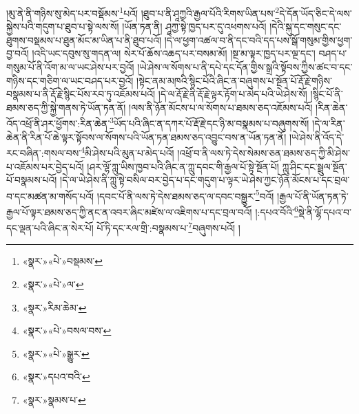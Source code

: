 །མུ་ནེ་ནི་གཉིས་སུ་མེད་པར་བསྡོམས་\footnote{«སྣར་»«པེ་»བསྡམས་}པའོ། །ཐུབ་པ་ནི་ཤཱཀྱའི་རྒྱལ་པོའི་རིགས་ཡིན་པས་\footnote{«སྣར་»«པེ་»ལ་}དེ་དོན་ཡོད་ཅིང་དེ་ལས་སྐྱེས་པའི་གདུག་པ་ཐུབ་པ་སྟེ་ལས་སོ། །ཡོན་ཏན་ནི། ཤཱཀྱ་སྟེ་ཁྱད་པར་དུ་འཕགས་པའོ། །དེའི་སྐུ་དང་གསུང་དང་ཐུགས་བསྡམས་པ་ཐུན་མོང་མ་ཡིན་པ་ནི་ཐུབ་པའོ། །དེ་ལ་ཕྱག་འཚལ་བ་ནི་དང་བའི་དད་པས་སྒོ་གསུམ་གྱིས་ཕྱག་བྱ་བའོ། །འདི་ཡང་དབུས་སུ་གདན་ལ། སེར་པོ་ཆོས་འཆད་པར་བསམ་མོ། །སྔ་མ་ལྟར་ཁྱད་པར་ལྔ་དང་། བཤད་པ་གསུམ་པོ་ནི་འོག་མ་ལ་ཡང་ཤེས་པར་བྱའོ། །ཡེ་ཤེས་ལ་སོགས་པ་ནི་དཔེ་དང་དོན་གྱིས་སྒྲའི་སྟོབས་ཀྱིས་ཚང་བ་དང་གཉིས་དང་གཅིག་ལ་ཡང་བཤད་པར་བྱའོ། །སྟེང་ནམ་མཁའི་སྙིང་པོའི་ཞིང་ན་བཞུགས་པ་སྔོན་པོ་རྡོ་རྗེ་གཉིས་བསྣམས་པ་ནི་རྡོ་རྗེ་སྙིང་པོས་རབ་ཏུ་འཇོམས་པའོ། །དེ་ལ་རྡོ་རྗེ་ནི་རྡོ་རྗེ་ལྟར་རྟོག་པ་མེད་པའི་ཡེ་ཤེས་སོ། །སྙིང་པོ་ནི་ཐམས་ཅད་ཀྱི་སྐྱེ་གནས་ཏེ་ཡོན་ཏན་ནོ། །ལས་ནི་ཉོན་མོངས་པ་ལ་སོགས་པ་ཐམས་ཅད་འཇོམས་པའོ། །རིན་ཆེན་འོད་འཕྲོ་ནི་ཤར་ཕྱོགས་:རིན་ཆེན་\footnote{«སྣར་»རིམ་ཆེམ་}ཡོད་པའི་ཞིང་ན་དཀར་པོ་རྡོ་རྗེ་དང་ཉི་མ་བསྣམས་པ་བཞུགས་སོ། །དེ་ལ་རིན་ཆེན་ནི་རིན་པོ་ཆེ་ལྟར་སྟོབས་ལ་སོགས་པའི་ཡོན་ཏན་ཐམས་ཅད་འབྱུང་བས་ན་ཡོན་ཏན་ནོ། །ཡེ་ཤེས་ནི་འོད་དེ་རང་བཞིན་:གསལ་བས་\footnote{«སྣར་»«པེ་»བསལ་བས་}མི་ཤེས་པའི་མུན་པ་མེད་པའོ། །འཕྲོ་བ་ནི་ལས་ཏེ་དེས་སེམས་ཅན་ཐམས་ཅད་ཀྱི་མི་ཤེས་པ་འཇོམས་པར་བྱེད་པའོ། །ཤར་ལྷོ་ཀླུ་ཡིས་ཁྱབ་པའི་ཞིང་ན་ཀླུ་དབང་གི་རྒྱལ་པོ་སྟེ་སྔོན་པོ། ཀླུ་ཤིང་དང་སྦྲུལ་སྔོན་པོ་བསྣམས་པའོ། །དེ་ལ་ཡེ་ཤེས་ནི་ཀླུ་སྟེ་བསིལ་བར་བྱེད་པ་དང་གདུག་པ་ལྟར་ཡེ་ཤེས་ཀྱང་ཉོན་མོངས་པ་དང་བྲལ་བ་དང་མཚན་མ་གསོད་པའོ། །དབང་པོ་ནི་ལས་ཏེ་དེས་ཐམས་ཅད་ལ་དབང་བསྒྱུར་\footnote{«སྣར་»«པེ་»སྒྱུར་}བའོ། །རྒྱལ་པོ་ནི་ཡོན་ཏན་ཏེ་རྒྱལ་པོ་ལྟར་ཐམས་ཅད་ཀྱི་ནང་ན་འབར་ཞིང་མཛེས་ལ་འཇིགས་པ་དང་བྲལ་བའོ། །:དཔའ་བོའི་\footnote{«སྣར་»དཔའ་བའི་}སྡེ་ནི་ལྷོ་དཔའ་བ་དང་ལྡན་པའི་ཞིང་ན་སེར་པོ། པོ་ཏི་དང་རལ་གྲི་:བསྣམས་པ་\footnote{«སྣར་»སྣམས་པ་}བཞུགས་པའོ། །
